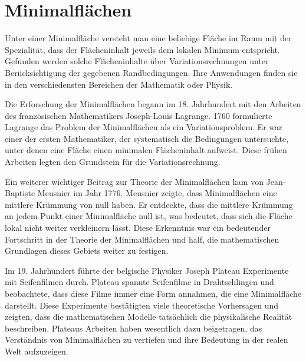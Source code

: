 %
%
%
%
\chapter{Minimalflächen\label{chapter:minimalflaechen}}
\begin{refsection}
%
%
%
%

\noindent
Unter einer Minimalfläche versteht man eine beliebige Fläche im
%
Raum mit der Spezialität, dass der Flächeninhalt jeweils dem lokalen
Minimum entspricht.
Gefunden werden solche Flächeninhalte über Variationsrechnungen
unter Berücksichtigung der gegebenen Randbedingungen.
Ihre Anwendungen finden sie in den verschiedensten Bereichen der
Mathematik oder Physik.
	
Die Erforschung der Minimalflächen begann im 18. Jahrhundert mit
den Arbeiten des französischen Mathematikers Joseph-Louis Lagrange.
%
%
1760 formulierte Lagrange das Problem der Minimalflächen als ein
Variationsproblem.
Er war einer der ersten Mathematiker, der systematisch die Bedingungen
untersuchte, unter denen eine Fläche einen minimalen Flächeninhalt
aufweist.
Diese frühen Arbeiten legten den Grundstein für die Variationsrechnung.

Ein weiterer wichtiger Beitrag zur Theorie der Minimalflächen kam
von Jean-Baptiste Meusnier im Jahr 1776.
%
%
Meusnier zeigte, dass Minimalflächen eine mittlere Krümmung von
null haben.
Er entdeckte, dass die mittlere Krümmung an jedem Punkt einer
Minimalfläche null ist, was bedeutet, dass sich die Fläche lokal
nicht weiter verkleinern lässt.
Diese Erkenntnis war ein bedeutender Fortschritt in der Theorie der
Minimalflächen und half, die mathematischen Grundlagen dieses Gebiets
weiter zu festigen.

Im 19. Jahrhundert führte der belgische Physiker Joseph Plateau
Experimente mit Seifenfilmen durch.
%
%
Plateau spannte Seifenfilme in Drahtschlingen und beobachtete, dass
diese Filme immer eine Form annahmen, die eine Minimalfläche
darstellt.
Diese Experimente bestätigten viele theoretische Vorhersagen und
zeigten, dass die mathematischen Modelle tatsächlich die physikalische
Realität beschreiben.
Plateaus Arbeiten haben wesentlich dazu beigetragen, das Verständnis
von Minimalflächen zu vertiefen und ihre Bedeutung in der realen
Welt aufzuzeigen.




\printbibliography[heading=subbibliography]
\end{refsection}
